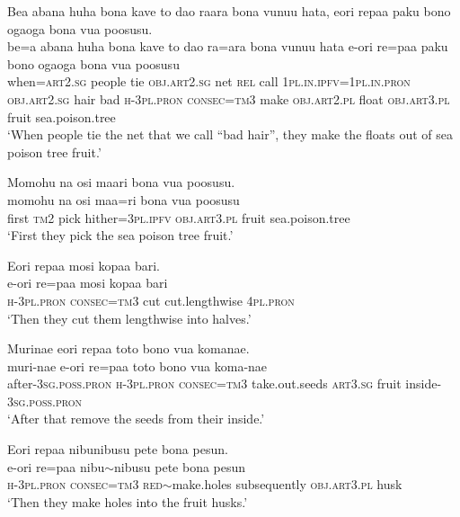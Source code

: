 \ea\label{ex:text5-1}
Bea abana huha bona kave to dao raara bona vunuu hata, eori repaa paku bono ogaoga bona vua poosusu.\\
\gll be=a	abana	huha	bona	kave	to	dao	ra=ara	bona	vunuu	hata	e-ori	re=paa	paku	bono	ogaoga	bona	vua	poosusu\\
     when=\textsc{art}2.\textsc{sg}	people	tie	\textsc{obj}.\textsc{art}2.\textsc{sg}	net	\textsc{rel}	call	1\textsc{pl}.\textsc{in}.\textsc{ipfv}=1\textsc{pl}.\textsc{in}.\textsc{pron}	\textsc{obj}.\textsc{art}2.\textsc{sg}	hair	bad	\textsc{h}-3\textsc{pl}.\textsc{pron}	\textsc{consec}=\textsc{tm}3	make	\textsc{obj}.\textsc{art}2.\textsc{pl}	float	\textsc{obj}.\textsc{art}3.\textsc{pl}	fruit	sea.poison.tree\\
\glt `When people tie the net that we call ``bad hair'', they make the floats out of sea poison tree fruit.'
\z

\ea\label{ex:text5-2}
Momohu na osi maari bona vua poosusu.\\
\gll momohu	na	osi	maa=ri	bona	vua	poosusu\\
     first	\textsc{tm}2	pick	hither=3\textsc{pl}.\textsc{ipfv}	\textsc{obj}.\textsc{art}3.\textsc{pl}	fruit	sea.poison.tree\\
\glt `First they pick the sea poison tree fruit.'
\z

\ea\label{ex:text5-3}
Eori repaa mosi kopaa bari.\\
\gll e-ori	re=paa	mosi	kopaa	bari\\
     \textsc{h}-3\textsc{pl}.\textsc{pron}	\textsc{consec}=\textsc{tm}3	cut	cut.lengthwise	4\textsc{pl}.\textsc{pron}\\
\glt `Then they cut them lengthwise into halves.'
\z

\ea\label{ex:text5-4}
Murinae eori repaa toto bono vua komanae.\\
\gll muri-nae	e-ori	re=paa	toto	bono	vua	koma-nae\\
     after-3\textsc{sg}.\textsc{poss}.\textsc{pron}	\textsc{h}-3\textsc{pl}.\textsc{pron}	\textsc{consec}=\textsc{tm}3	take.out.seeds	\textsc{art}3.\textsc{sg}	fruit	inside-3\textsc{sg}.\textsc{poss}.\textsc{pron}\\
\glt `After that remove the seeds from their inside.'
\z

\ea\label{ex:text5-5}
Eori repaa nibunibusu pete bona pesun.\\
\gll e-ori	re=paa	nibu{$\sim$}nibusu	pete	bona	pesun\\
     \textsc{h}-3\textsc{pl}.\textsc{pron}	\textsc{consec}=\textsc{tm}3	\textsc{red}{$\sim$}make.holes	subsequently	\textsc{obj}.\textsc{art}3.\textsc{pl}	husk\\
\glt `Then they make holes into the fruit husks.'
\z


